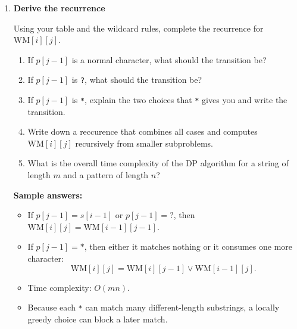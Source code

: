 \documentclass[11pt]{article}
\begin{document}
\begin{enumerate}[leftmargin=0pt, itemindent=1.7em, itemsep=1.2em]
\item \textbf{Derive the recurrence}

Using your table and the wildcard rules, complete the recurrence for $\mathrm{WM}[i][j]$.

\begin{enumerate}[label=(\alph*), leftmargin=2em, itemsep=0.8em]
\item If $p[j-1]$ is a normal character, what should the transition be?

\vspace{1.6cm}

\item If $p[j-1]$ is \texttt{?}, what should the transition be?

\vspace{1.6cm}

\item If $p[j-1]$ is \texttt{*}, explain the two choices that \texttt{*} gives you and write the transition.

\vspace{1.6cm}

\item Write down a reccurence that combines all cases and computes $\mathrm{WM}[i][j]$ recursively from smaller subproblems.

\vspace{0.9cm}

\item What is the overall time complexity of the DP algorithm for a string of length $m$ and a pattern of length $n$?

\vspace{0.9cm}

\end{enumerate}

\ifanswers
\textbf{Sample answers:}
\begin{itemize}
    \item If $p[j-1]=s[i-1]$ or $p[j-1]=\texttt{?}$, then $\mathrm{WM}[i][j]=\mathrm{WM}[i-1][j-1]$.
    \item If $p[j-1]=\texttt{*}$, then either it matches nothing or it consumes one more character:
    \[
    \mathrm{WM}[i][j]=\mathrm{WM}[i][j-1] \vee \mathrm{WM}[i-1][j].
    \]
    \item Time complexity: $O(mn)$.
    \item Because each \texttt{*} can match many different-length substrings, a locally greedy choice can block a later match.
\end{itemize}
\fi

\end{enumerate}
\end{document}
